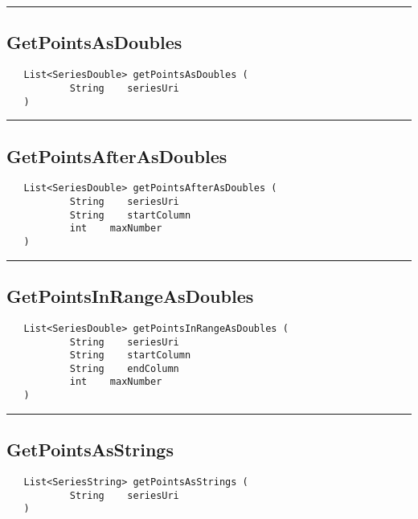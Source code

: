 \rule{15cm}{2pt}
\subsection{GetPointsAsDoubles}
\label{Api:GetPointsAsDoubles}
\begin{verbatim}
   List<SeriesDouble> getPointsAsDoubles (
           String    seriesUri
   )
\end{verbatim}



\rule{15cm}{2pt}
\subsection{GetPointsAfterAsDoubles}
\label{Api:GetPointsAfterAsDoubles}
\begin{verbatim}
   List<SeriesDouble> getPointsAfterAsDoubles (
           String    seriesUri
           String    startColumn
           int    maxNumber
   )
\end{verbatim}



\rule{15cm}{2pt}
\subsection{GetPointsInRangeAsDoubles}
\label{Api:GetPointsInRangeAsDoubles}
\begin{verbatim}
   List<SeriesDouble> getPointsInRangeAsDoubles (
           String    seriesUri
           String    startColumn
           String    endColumn
           int    maxNumber
   )
\end{verbatim}



\rule{15cm}{2pt}
\subsection{GetPointsAsStrings}
\label{Api:GetPointsAsStrings}
\begin{verbatim}
   List<SeriesString> getPointsAsStrings (
           String    seriesUri
   )
\end{verbatim}



